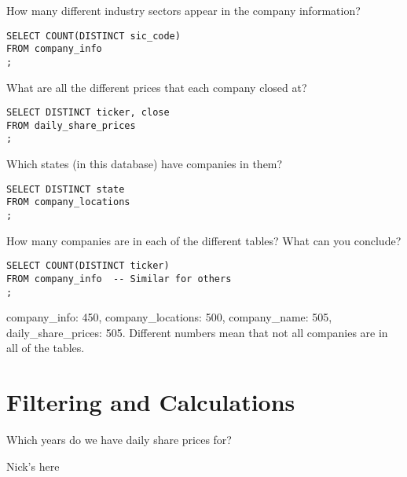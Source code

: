 \documentclass[10pt]{exam}
\begin{document}
\begin{questions}
\question How many different industry sectors appear in the company
information?

\begin{solution}
\begin{lstlisting}
SELECT COUNT(DISTINCT sic_code)
FROM company_info
;
\end{lstlisting}
\end{solution}


\question What are all the different prices that each company closed at?

\begin{solution}
\begin{lstlisting}
SELECT DISTINCT ticker, close
FROM daily_share_prices
;
\end{lstlisting}
\end{solution}


\question Which states (in this database) have companies in them?

\begin{solution}
\begin{lstlisting}
SELECT DISTINCT state
FROM company_locations
;
\end{lstlisting}
\end{solution}


\question How many companies are in each of the different tables? What can
you conclude?

\begin{solution}
\begin{lstlisting}
SELECT COUNT(DISTINCT ticker)
FROM company_info  -- Similar for others
;
\end{lstlisting}
company\_info: 450, company\_locations: 500, company\_name: 505,
daily\_share\_prices: 505. Different numbers mean that not all companies
are in all of the tables.
\end{solution}


\end{questions}
\newpage
\section{Filtering and Calculations}
\begin{questions}


\question Which years do we have daily share prices for?

\begin{solution}
    Nick's here
\end{solution}


\end{questions}
\end{document}
